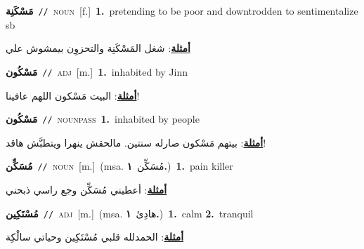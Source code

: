 \documentclass[10pt,a4paper,twoside]{article} %
\begin{document}
\begin{multicols}{2}
{\setlength\topsep{0pt}\textbf{\foreignlanguage{arabic}{مَسْكَنِة}}\ {\color{gray}\texttt{//}\color{black}}\ \textsc{noun}\ [f.]\ \textbf{1.}~pretending to be poor and downtrodden to sentimentalize sb\  \begin{flushright}\color{gray}\foreignlanguage{arabic}{\textbf{\underline{\foreignlanguage{arabic}{أمثلة}}}: شغل المَسْكَنِة والتحزوِن بيمشوش علي}\end{flushright}\color{black}} \vspace{2mm}

{\setlength\topsep{0pt}\textbf{\foreignlanguage{arabic}{مَسْكُون}}\ {\color{gray}\texttt{//}\color{black}}\ \textsc{adj}\ [m.]\ \textbf{1.}~inhabited by Jinn\  \begin{flushright}\color{gray}\foreignlanguage{arabic}{\textbf{\underline{\foreignlanguage{arabic}{أمثلة}}}: البيت مَسْكون اللهم عافينا!}\end{flushright}\color{black}} \vspace{2mm}

{\setlength\topsep{0pt}\textbf{\foreignlanguage{arabic}{مَسْكُون}}\ {\color{gray}\texttt{//}\color{black}}\ \textsc{noun\textunderscore pass}\ \textbf{1.}~inhabited by people\  \begin{flushright}\color{gray}\foreignlanguage{arabic}{\textbf{\underline{\foreignlanguage{arabic}{أمثلة}}}: بيتهم مَسْكون صارله سنتين. مالحقش ينهرا ويتطبَّش هاقد!}\end{flushright}\color{black}} \vspace{2mm}

{\setlength\topsep{0pt}\textbf{\foreignlanguage{arabic}{مُسَكِّن}}\ {\color{gray}\texttt{//}\color{black}}\ \textsc{noun}\ [m.]\ \color{gray}(msa. \foreignlanguage{arabic}{مُسَكِّن}~\foreignlanguage{arabic}{\textbf{١.}})\color{black}\ \textbf{1.}~pain killer\  \begin{flushright}\color{gray}\foreignlanguage{arabic}{\textbf{\underline{\foreignlanguage{arabic}{أمثلة}}}: أعطيني مُسَكِّن وجع راسي ذبحني}\end{flushright}\color{black}} \vspace{2mm}

{\setlength\topsep{0pt}\textbf{\foreignlanguage{arabic}{مُسْتَكِين}}\ {\color{gray}\texttt{//}\color{black}}\ \textsc{adj}\ [m.]\ \color{gray}(msa. \foreignlanguage{arabic}{هادِئ}~\foreignlanguage{arabic}{\textbf{١.}})\color{black}\ \textbf{1.}~calm  \textbf{2.}~tranquil\  \begin{flushright}\color{gray}\foreignlanguage{arabic}{\textbf{\underline{\foreignlanguage{arabic}{أمثلة}}}: الحمدلله قلبي مُسْتَكِين وحياتي سالْكِة}\end{flushright}\color{black}} \vspace{2mm}


\end{multicols}
\end{document}
